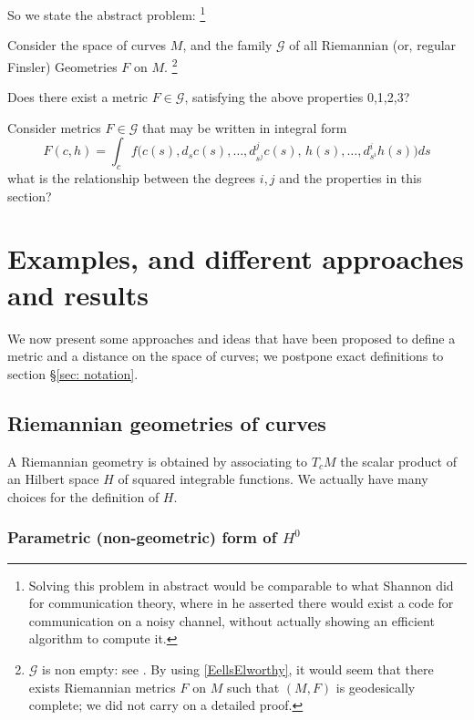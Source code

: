 \documentclass[twoside,a4paper,english]{article}
\begin{document}
So we state the abstract problem:%
\footnote{
  Solving this problem in abstract would be comparable to what Shannon
  did for communication theory, where in \cite{Shannon:TheMatThe} he
  asserted there would exist a code for communication on a noisy
  channel, without actually showing an efficient algorithm to compute it.
}
\begin{Problem}
  Consider the space of curves $M$, and the family $\mathcal G$ of all
  Riemannian (or, regular Finsler) Geometries $F$  on $M$.%
  \footnote{$\mathcal G$ is non empty: see \cite{Lang:FDG}.
    By using \ref{EellsElworthy}, it would seem that there 
    exists Riemannian metrics $F$ on $M$ such that  $(M,F)$ is geodesically
    complete; we did not carry on a detailed proof.}

  Does there exist a metric $F\in \mathcal G$, satisfying  
  the above properties 0,1,2,3?

  Consider metrics $F\in \mathcal G$ that
  may be written in integral form
  \[ F(c,h)= \int_c f\big(c(s),d_s c(s),\ldots, 
  d_{s^j}^j c(s),\, h(s),\ldots, d_{s^i}^i h(s) \big) ds  \]
  what is the relationship between the
  degrees $i,j$ and the properties in this section?
\end{Problem}


\section{Examples, and different approaches and results}
\label{sec:approaches}
We now present some approaches and ideas that have been proposed
to define a metric and a distance on the space of curves;
we postpone exact definitions to section \S\ref{sec: notation}.

\subsection{Riemannian geometries of curves}
\label{sec: ex Riem}

A  Riemannian geometry is obtained by associating to 
$T_cM$ the scalar product of
an Hilbert space $H$ of squared integrable functions.
We actually have many choices for the definition of $H$.

\subsubsection{Parametric (non-geometric) form of $H^0$}
\end{document}
